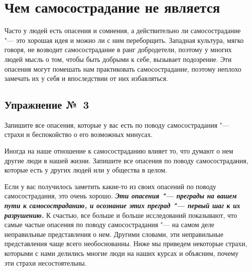 
\section{Чем самосострадание не является} \label{What_Self-Compassion_Is_Not}

Часто у людей есть опасения и сомнения, а действительно ли самосострадание "--- это хорошая идея и можно ли с ним переборщить. Западная культура, мягко говоря, не возводит самосострадание в ранг добродетели, поэтому у многих людей мысль о том, чтобы быть добрыми к себе, вызывает подозрение. Эти опасения могут помешать нам практиковать самосострадание, поэтому неплохо замечать их у себя и впоследствии от них избавляться.

\subsection{Упражнение №~3}


\vspace{3ex}

Запишите все опасения, которые у вас есть по поводу самосострадания "--- страхи и беспокойство о его возможных минусах.

\vfill

Иногда на наше отношение к самосостраданию влияет то, что думают о нем другие люди в нашей жизни. Запишите все опасения по поводу самосострадания, которые есть у других людей или у общества в целом.

\vfill


\newpage



\vspace{3ex}

Если у вас получилось заметить какие-то из своих опасений по поводу самосострадания, это очень хорошо. \textbf{\textit{Эти опасения "--- преграды на вашем пути к самосостраданию, и осознание этих преград "--- первый шаг к их разрушению.}} К счастью, все больше и больше исследований показывают, что самые частые опасения по поводу самосострадания "--- на самом деле неправильные представления о нем. Другими словами, эти неправильные представления чаще всего необоснованны. Ниже мы приведем некоторые страхи, которыми с нами делились многие люди на наших курсах и объясним, почему эти страхи несостоятельны.

